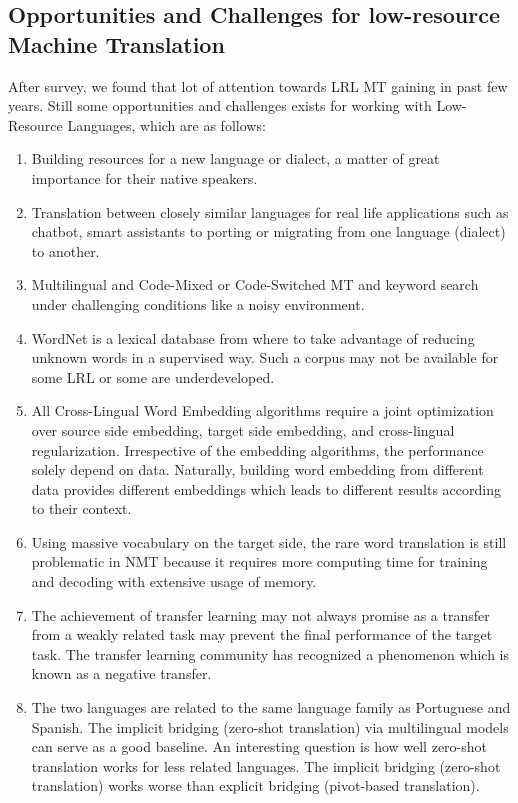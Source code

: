 \documentclass[manuscript,screen]{acmart}
\begin{document}
\subsection{Opportunities and Challenges for low-resource Machine Translation}
After survey, we found that lot of attention towards LRL MT gaining in past few years. Still some opportunities and challenges exists for working with Low-Resource Languages, which are as follows:
\begin{enumerate}
    \item Building resources for a new language or dialect, a matter of great importance for their native speakers.
    \item Translation between closely similar languages for real life applications such as chatbot, smart assistants to porting or migrating from one language (dialect) to another.
    \item Multilingual and Code-Mixed or Code-Switched MT and keyword search under challenging conditions like a noisy environment.
    \item WordNet is a lexical database from where to take advantage of reducing unknown words in a supervised way. Such a corpus may not be available for some LRL or some are underdeveloped.
    \item All Cross-Lingual Word Embedding algorithms require a joint optimization over source side embedding, target side embedding, and cross-lingual regularization. Irrespective of the embedding algorithms, the performance solely depend on data. Naturally, building word embedding from different data provides different embeddings which leads to different results according to their context.
    \item  Using massive vocabulary on the target side, the rare word translation is still problematic in NMT because it requires more computing time for training and decoding with extensive usage of memory. 
    \item The achievement of transfer learning may not always promise as a transfer from a weakly related task may prevent the final performance of the target task. The transfer learning community has recognized a phenomenon which is known as a negative transfer. 
    \item The two languages are related to the same language family as Portuguese and Spanish. The implicit bridging (zero-shot translation) via multilingual models can serve as a good baseline. An interesting question is how well zero-shot translation works for less related languages. The implicit bridging (zero-shot translation) works worse than explicit bridging (pivot-based translation).

\end{enumerate}
\end{document}
